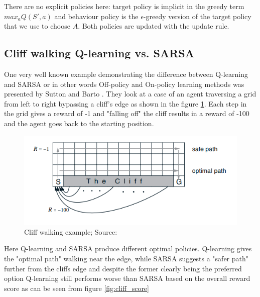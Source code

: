 There are no explicit policies here: target policy is implicit in the greedy term $max_a Q(S', a)$ and behaviour policy is the $\epsilon$-greedy version of the target policy that we use to choose $A$. Both policies are updated with the update rule.

\subsection{Cliff walking  Q-learning vs. SARSA}
One very well known example demonstrating the difference between
Q-learning and SARSA or in other words Off-policy and On-policy learning methods was presented by Sutton and Barto \cite{sutton_barto}. They look at a case of an agent traversing a grid from left to right bypassing a cliff's edge as shown in the figure \ref{fig:cliff}. Each
step in the grid gives a reward of -1 and "falling off" 
the cliff results in a reward of -100 and the agent goes
back to the starting position.

\begin{figure}[H]
\centering
\includegraphics[scale=0.6]{figures/cliff_scheme.PNG}
  \caption{Cliff walking example; Source: \cite{sutton_barto}}
  \label{fig:cliff}
\end{figure}

Here Q-learning and SARSA produce different optimal policies. Q-learning gives the "optimal path" walking near the edge, while SARSA suggests a "safer path" further
from the cliffs edge and despite the former clearly 
being the preferred option Q-learning still performs 
worse than SARSA based on the overall reward score as can be seen from figure \ref{fig:cliff_score}

